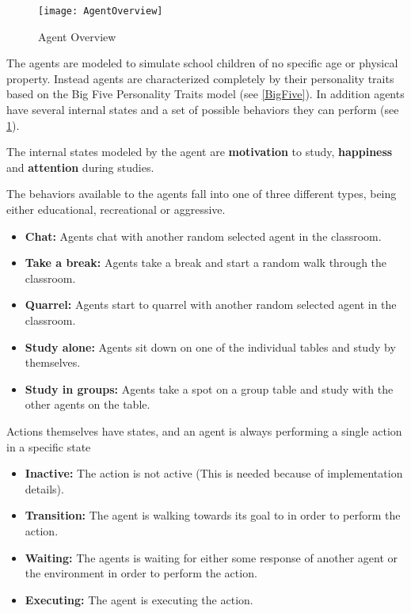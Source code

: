 \begin{figure}[]
    \centering
    \texttt{[image: AgentOverview]}
    \caption{Agent Overview}
    \label{AgentOverview}
\end{figure}

The agents are modeled to simulate school children of no specific age or physical
property. Instead agents are characterized completely by their personality traits
based on the Big Five Personality Traits model (see \ref{BigFive}). In addition
agents have several internal states and a set of possible behaviors they can perform (see \ref{AgentOverview}).

The internal states modeled by the agent are \textbf{motivation} to study, \textbf{happiness}
and \textbf{attention} during studies.

The behaviors available to the agents fall into one of three different types, being
either educational, recreational or aggressive.

\begin{itemize}
    \item \textbf{Chat:} Agents chat with another random selected agent in the classroom.
    \item \textbf{Take a break:} Agents take a break and start a random walk through the classroom.
    \item \textbf{Quarrel:} Agents start to quarrel with another random selected agent in the classroom.
    \item \textbf{Study alone:} Agents sit down on one of the individual tables and study by themselves.
    \item \textbf{Study in groups:} Agents take a spot on a group table and study with the other agents on the table.
\end{itemize}

Actions themselves have states, and an agent is always performing a single action
in a specific state

\begin{itemize}
    \item \textbf{Inactive:} The action is not active (This is needed because of implementation details). 
    \item \textbf{Transition:} The agent is walking towards its goal to in order to perform the action.
    \item \textbf{Waiting:} The agents is waiting for either some response of another agent or the environment in order to perform the action.
    \item \textbf{Executing:} The agent is executing the action.
\end{itemize}

